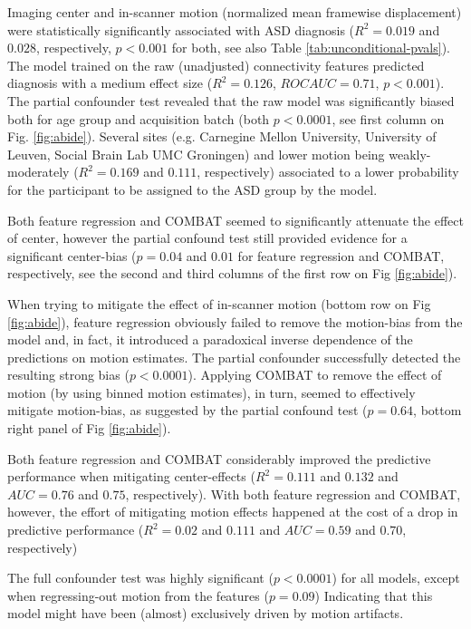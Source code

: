 \documentclass{article}
\begin{document}
Imaging center and in-scanner motion (normalized mean framewise displacement) were statistically significantly associated with ASD diagnosis ($R^2=0.019$ and $0.028$, respectively, $p<0.001$ for both, see also Table \ref{tab:unconditional-pvals}). The model trained on the raw (unadjusted) connectivity features predicted diagnosis with a medium effect size ($R^2=0.126$, $ROC AUC = 0.71$, $p<0.001$).
The partial confounder test revealed that the raw model was significantly biased both for age group and acquisition batch (both $p<0.0001$, see first column on Fig. \ref{fig:abide}). Several sites (e.g. Carnegine Mellon University, University of Leuven, Social Brain Lab UMC Groningen) and lower motion being weakly-moderately ($R^2=0.169$ and $0.111$, respectively) associated to a lower probability for the participant to be assigned to the ASD group by the model.

Both feature regression and COMBAT seemed to significantly attenuate the effect of center, however the partial confound test still provided evidence for a significant center-bias ($p=0.04$ and $0.01$ for feature regression and COMBAT, respectively, see the second and third columns of the first row on Fig \ref{fig:abide}). 

When trying to mitigate the effect of in-scanner motion (bottom row on Fig \ref{fig:abide}), feature regression obviously failed to remove the motion-bias from the model and, in fact, it introduced a paradoxical inverse dependence of the predictions on motion estimates. The partial confounder successfully detected the resulting strong bias ($p<0.0001$). Applying COMBAT to remove the effect of motion (by using binned motion estimates), in turn, seemed to effectively mitigate motion-bias, as suggested by the partial confound test ($p=0.64$, bottom right panel of Fig \ref{fig:abide}).

Both feature regression and COMBAT considerably improved the predictive performance when mitigating center-effects ($R^2=0.111$ and $0.132$ and $AUC=0.76$ and $0.75$, respectively). With both feature regression and COMBAT, however, the effort of mitigating motion effects happened at the cost of a drop in predictive performance ($R^2=0.02$ and $0.111$ and $AUC=0.59$ and $0.70$, respectively)

The full confounder test was highly significant ($p<0.0001$) for all models, except when regressing-out motion from the features ($p=0.09$) Indicating that this model might have been (almost) exclusively driven by motion artifacts.
\end{document}
